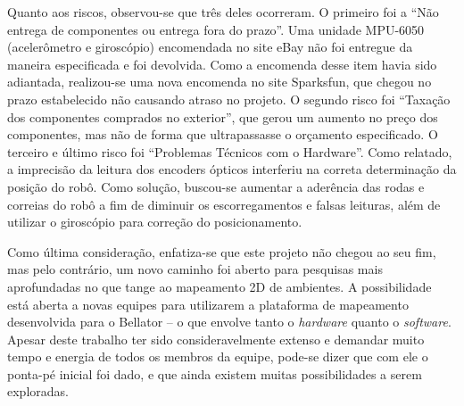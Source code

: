 Quanto aos riscos, observou-se que três deles ocorreram. O primeiro foi a ``Não entrega de componentes ou entrega fora do prazo''. Uma unidade MPU-6050 (acelerômetro e giroscópio) encomendada no site eBay não foi entregue da maneira especificada e foi devolvida. Como a encomenda desse item havia sido adiantada, realizou-se uma nova encomenda no site Sparksfun, que chegou no prazo estabelecido não causando atraso no projeto. O segundo risco foi ``Taxação dos componentes comprados no exterior'', que gerou um aumento no preço dos componentes, mas não de forma que ultrapassasse o orçamento especificado. O terceiro e último risco foi ``Problemas Técnicos com o Hardware''. Como relatado, a imprecisão da leitura dos encoders ópticos interferiu na correta determinação da posição do robô. Como solução, buscou-se aumentar a aderência das rodas e correias do robô a fim de diminuir os escorregamentos e falsas leituras, além de utilizar o giroscópio para correção do posicionamento.

Como última consideração, enfatiza-se que este projeto não chegou ao seu fim, mas pelo contrário, um novo caminho foi aberto para pesquisas mais aprofundadas no que tange ao mapeamento 2D de ambientes. A possibilidade está aberta a novas equipes para utilizarem a plataforma de mapeamento desenvolvida para o Bellator -- o que envolve tanto o \textit{hardware} quanto o \textit{software}. Apesar deste trabalho ter sido consideravelmente extenso e demandar muito tempo e energia de todos os membros da equipe, pode-se dizer que com ele o ponta-pé inicial foi dado, e que ainda existem muitas possibilidades a serem exploradas.


%


